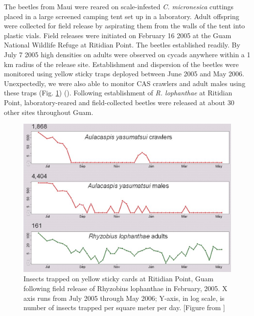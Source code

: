 \documentclass[12pt,letterpaper,english,bibliography=totocnumbered, abstract=on]{scrartcl}
\begin{document}
The beetles from Maui were reared on scale-infested \textit{C. micronesica} cuttings placed in a large screened camping tent set up in a laboratory. Adult offspring were collected for field release by aspirating them from the walls of the tent into plastic vials. Field releases were initiated on February 16 2005 at the Guam National Wildlife Refuge at Ritidian Point. The beetles established readily. By July 7 2005 high densities on adults were observed on cycads anywhere within a 1 km radius of the release site.  Establishment and dispersion of the beetles were monitored using yellow sticky traps deployed between June 2005 and May 2006. Unexpectedly, we were also able to monitor CAS crawlers and adult males using these traps (Fig. \ref{fig:sticky-traps})  (\cite{moore_biological_2017-2}). Following establishment of \textit{R. lophanthae} at Ritidian Point, laboratory-reared and field-collected beetles were released at about 30 other sites throughout Guam. 

\begin{figure}[H]
	\centering
	\includegraphics[width=\linewidth]{sticky-traps1}
	
	\caption{Insects trapped on yellow sticky cards at Ritidian Point, Guam following field release of Rhyzobius lophanthae in February, 2005. X axis runs from July 2005 through May 2006; Y-axis, in log scale, is number of insects trapped per square meter per day. [Figure from \cite{moore_biological_2013-2}]}
	
	\label{fig:sticky-traps}
\end{figure}
\end{document}
